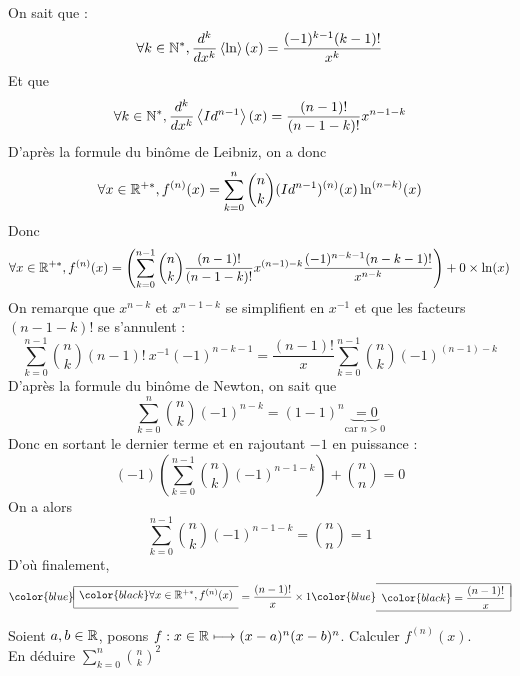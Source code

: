 \documentclass{fancybook}
\newcommand{\lboxed}[1]{{\color{blue}\begin{array}{|l}\hline\\[-2.4ex]{\color{black}#1}\\[1.2ex]\hline\end{array}}}
\newcommand{\rboxed}[1]{{\color{blue}\begin{array}{r|}\hline\\[-2.4ex]{\color{black}#1}\\[1.2ex]\hline\end{array}}}
\begin{document}
\begin{solution}
On sait que :
\[
\forall k \in \mathbb{N}^*, \dfrac{d^k}{dx^k}\left\langle\ln\right\rangle(x) = \dfrac{(-1)^{k-1}(k-1)!}{x^k}
\]
Et que 
\[
\forall k \in \mathbb{N}^*, \dfrac{d^k}{dx^k}\left\langle Id^{n-1} \right\rangle(x) = \dfrac{(n-1)!}{(n-1-k)!} x^{n-1-k}
\]
D'après la formule du binôme de Leibniz, on a donc
\[
\forall x \in \mathbb{R}^{+*}, 
f^{(n)}(x)
= \displaystyle\sum\limits_{k=0}^{n} \binom{n}{k} (Id^{n-1})^{(n)}(x) \ln^{(n-k)}(x)
\]
Donc 
\[
\forall x \in \mathbb{R}^{+*}, 
f^{(n)}(x)
= \left(\displaystyle\sum\limits_{k=0}^{n-1} \binom{n}{k} \dfrac{(n-1)!}{(n-1-k)!} x^{(n-1)-k} \dfrac{(-1)^{n-k-1}(n-k-1)!}{x^{n-k}}\right) + 0 \times \ln(x)
\]
On remarque que $x^{n-k}$ et $x^{n-1-k}$ se simplifient en $x^{-1}$ et que les facteurs $(n-1-k)!$ se s'annulent :
\[
\displaystyle\sum\limits_{k=0}^{n-1} \binom{n}{k} (n-1)! \: x^{-1} (-1)^{n-k-1}
= \dfrac{(n-1)!}{x} \displaystyle\sum\limits_{k=0}^{n-1} \binom{n}{k} (-1)^{(n-1)-k}
\]
D'après la formule du binôme de Newton, on sait que 
\[
\displaystyle\sum\limits_{k=0}^{n} \binom{n}{k} (-1)^{n-k} = (1-1)^n \underbrace{= 0}_{\text{car $n > 0$}}
\]
Donc en sortant le dernier terme et en rajoutant $-1$ en puissance :
\[
(-1)\left(\displaystyle\sum\limits_{k=0}^{n-1} \binom{n}{k} (-1)^{n-1-k}\right) + \binom{n}{n} = 0
\]
On a alors 
\[
\displaystyle\sum\limits_{k=0}^{n-1} \binom{n}{k} (-1)^{n-1-k} = \binom{n}{n} = 1
\]
D'où finalement, 
\[
\lboxed{\forall x \in \setRealNumbers^{+*}, 
f^{(n)}(x)}
= \dfrac{(n-1)!}{x} \times 1 
\rboxed{= \dfrac{(n-1)!}{x}}
\] 
\end{solution}

\begin{exercice}
Soient $a,b\in\mathbb{R}$, posons $\function[f]{x\in\setRealNumbers}{(x-a)^n (x-b)^n}$. Calculer $f^{(n)}(x)$.\\
En déduire $\displaystyle\sum\limits_{k=0}^{n} \binom{n}{k}^2$
\end{exercice}
\end{document}

